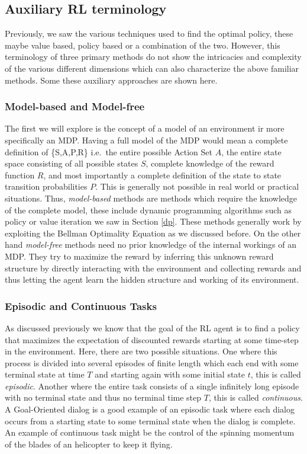 \documentclass[12pt]{extarticle}
\numberwithin{equation}{section}
\begin{document}
	\subsection{Auxiliary RL terminology}
	Previously, we saw the various techniques used to find the optimal policy, these maybe value based, policy based or a combination of the two. However, this terminology of three primary methods do not show the intricacies and complexity of the various different dimensions which can also characterize the above familiar methods. Some these auxiliary approaches are shown here.
	\subsubsection{Model-based and Model-free}
	The first we will explore is the concept of a model of an environment ir more specifically an MDP. Having a full model of the MDP would mean a complete definition of \{S,A,P,R\} i.e.\ the entire possible Action Set $A$, the entire state space consisting of all possible states $S$, complete knowledge of the reward function $R$, and most importantly a complete definition of the state to state transition probabilities $P$. This is generally not possible in real world or practical situations. Thus, \textit{model-based} methods are methods which require the knowledge of the complete model, these include dynamic programming algorithms such as policy or value iteration\cite{Sutton-introRL} we saw in Section \ref{dp}. These methods generally work by exploiting the Bellman Optimality Equation as we discussed before. On the other hand \textit{model-free} methods need no prior knowledge of the internal workings of an MDP. They try to maximize the reward by inferring this unknown reward structure by directly interacting with the environment and collecting rewards and thus letting the agent learn the hidden structure and working of its environment.
	\subsubsection{Episodic and Continuous Tasks}
	As discussed previously we know that the goal of the RL agent is to find a policy that maximizes the expectation of discounted rewards starting at some time-step in the environment. Here, there are two possible situations. One where this process is divided into several episodes of finite length which each end with some terminal state at time $T$ and starting again with some initial state $t$, this is called \textit{episodic}. Another where the entire task consists of a single infinitely long episode with no terminal state and thus no terminal time step $T$, this is called \textit{continuous}. A Goal-Oriented dialog is a good example of an episodic task where each dialog occurs from a starting state to some terminal state when the dialog is complete. An example of continuous task might be the control of the spinning momentum of the blades of an helicopter to keep it flying.
\end{document}
